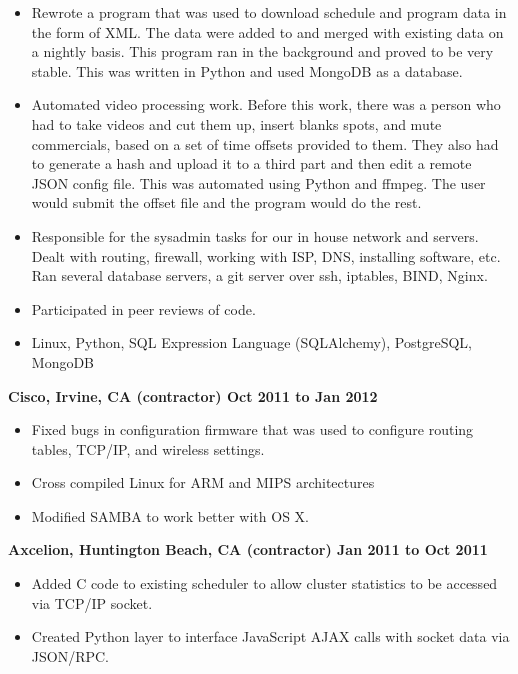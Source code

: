 \documentclass{res}
\begin{document}
\begin{resume}
\begin{itemize}
\item Rewrote a program that was used to download schedule and program
data in the form of XML.  The data were added to and merged with existing
data on a nightly basis.  This program ran in the background and proved
to be very stable.  This was written in Python and used MongoDB as
a database.

\item Automated video processing work.  Before this work, there was a
person who had to take videos and cut them up, insert blanks spots, and
mute commercials, based on a set of time offsets provided to them.  They
also had to generate a hash and upload it to a third part and then edit
a remote JSON config file.  This was automated using Python and ffmpeg.
The user would submit the offset file and the program would do the rest.

\item Responsible for the sysadmin tasks for our in house network
and servers.  Dealt with routing, firewall, working with ISP, DNS,
installing software, etc.  Ran several database servers, a git server
over ssh, iptables, BIND, Nginx.

\item Participated in peer reviews of code.

\item Linux, Python, SQL Expression Language (SQLAlchemy), PostgreSQL,
MongoDB
\end{itemize}

{\large \bf Cisco, Irvine, CA (contractor) \hfill Oct 2011 to Jan 2012}
\begin{itemize}
\item Fixed bugs in configuration firmware that was used to configure
 routing tables, TCP/IP, and wireless settings.
\item Cross compiled Linux for ARM and MIPS architectures
\item Modified SAMBA to work better with OS X.
\end{itemize}

{\large \bf Axcelion, Huntington Beach, CA (contractor) \hfill Jan 2011
to Oct 2011}

\begin{itemize}

\item Added  C code to existing scheduler to allow cluster statistics
to be accessed via TCP/IP socket.

\item Created Python layer to interface JavaScript AJAX calls with socket
data via JSON/RPC.


\end{itemize}
\end{resume}
\end{document}
